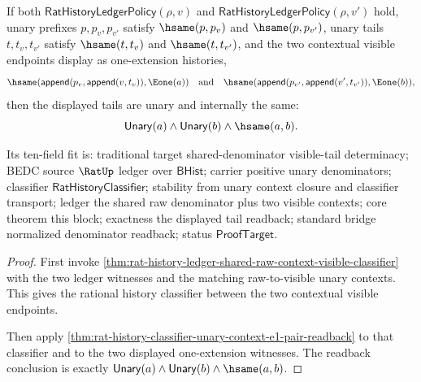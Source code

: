 \begin{theorem}
\label{thm:rat-history-ledger-shared-raw-context-e1-pair-readback}
If both $\mathsf{RatHistoryLedgerPolicy}(\rho,v)$ and
$\mathsf{RatHistoryLedgerPolicy}(\rho,v')$ hold, unary prefixes
$p,p_v,p_{v'}$ satisfy $\hsame(p,p_v)$ and $\hsame(p,p_{v'})$, unary tails
$t,t_v,t_{v'}$ satisfy $\hsame(t,t_v)$ and $\hsame(t,t_{v'})$, and the two
contextual visible endpoints display as one-extension histories,
$$
\hsame(\mathsf{append}(p_v,\mathsf{append}(v,t_v)),\Eone(a))
\quad\text{and}\quad
\hsame(\mathsf{append}(p_{v'},\mathsf{append}(v',t_{v'})),\Eone(b)),
$$
then the displayed tails are unary and internally the same:
$$
\mathsf{Unary}(a)\land \mathsf{Unary}(b)\land\hsame(a,b).
$$

Its ten-field fit is: traditional target shared-denominator visible-tail
determinacy; BEDC source $\RatUp$ ledger over $\mathsf{BHist}$; carrier positive
unary denominators; classifier $\mathsf{RatHistoryClassifier}$; stability from
unary context closure and classifier transport; ledger the shared raw
denominator plus two visible contexts; core theorem this block; exactness the
displayed tail readback; standard bridge normalized denominator readback; status
$\mathsf{ProofTarget}$.
\end{theorem}
\begin{proof}
First invoke
\autoref{thm:rat-history-ledger-shared-raw-context-visible-classifier} with the
two ledger witnesses and the matching raw-to-visible unary contexts. This gives
the rational history classifier between the two contextual visible endpoints.

Then apply
\autoref{thm:rat-history-classifier-unary-context-e1-pair-readback} to that
classifier and to the two displayed one-extension witnesses. The readback
conclusion is exactly $\mathsf{Unary}(a)\land \mathsf{Unary}(b)\land
\hsame(a,b)$.
\end{proof}

